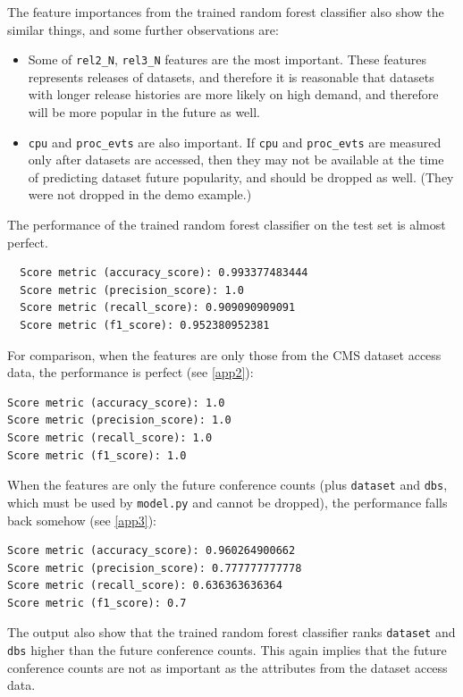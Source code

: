 \documentclass[preprint, 12pt]{elsarticle}
\begin{document}
The feature importances from the trained random forest classifier also show the similar things, and some further observations are:

\begin{itemize}
  
\item   
Some of \verb|rel2_N|, \verb|rel3_N| features are the most important.
These features represents releases of datasets, and therefore it is reasonable that datasets with longer release histories are more likely on high demand, and therefore will be more popular in the future as well.

\item
\verb|cpu| and \verb|proc_evts| are also important.
If \verb|cpu| and \verb|proc_evts| are measured only after datasets are accessed, then they may not be available at the time of predicting dataset future popularity, and should be dropped as well. (They were not dropped in the demo example.)

\end{itemize}


The performance of the trained random forest classifier on the test set is almost perfect.
\begin{verbatim}
  Score metric (accuracy_score): 0.993377483444
  Score metric (precision_score): 1.0
  Score metric (recall_score): 0.909090909091
  Score metric (f1_score): 0.952380952381
\end{verbatim}


For comparison, when the features are only those from the CMS dataset access data, the performance is perfect (see  \ref{app2}):
\begin{verbatim}
Score metric (accuracy_score): 1.0
Score metric (precision_score): 1.0
Score metric (recall_score): 1.0
Score metric (f1_score): 1.0
\end{verbatim}


When the features are only the future conference counts (plus \verb|dataset| and \verb|dbs|, which must be used by \verb|model.py| and cannot be dropped), the performance falls back somehow (see \ref{app3}):
\begin{verbatim}
Score metric (accuracy_score): 0.960264900662
Score metric (precision_score): 0.777777777778
Score metric (recall_score): 0.636363636364
Score metric (f1_score): 0.7
\end{verbatim}
The output also show that the trained random forest classifier ranks \verb|dataset| and \verb|dbs| higher than the future conference counts.
This again implies that the future conference counts are not as important as the attributes from the dataset access data.
\end{document}
